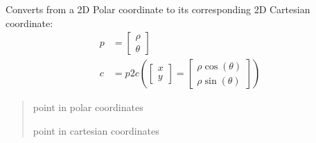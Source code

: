 \documentclass[letterpaper,10pt,english]{sphinxmanual}
\begin{document}
\begin{fulllineitems}
\label{\detokenize{conversions:conversions.p2c}}
\pysigstartsignatures
{}
\pysigstopsignatures
\sphinxAtStartPar
Converts from a 2D Polar coordinate to its corresponding 2D Cartesian coordinate:
\begin{equation}\label{equation:conversions:eq-p2c}
\begin{split}p & = \begin{bmatrix} \rho \\ \theta \end{bmatrix} \\
c &= p2c \left(\begin{bmatrix} x \\ y \end{bmatrix} =  \begin{bmatrix} \rho \cos(\theta) \\ \rho \sin(\theta) \end{bmatrix}\right)\end{split}
\end{equation}\begin{quote}\begin{description}
\sphinxAtStartPar
{} \textendash{} point in polar coordinates

\sphinxAtStartPar
point in cartesian coordinates

\end{description}\end{quote}

\end{fulllineitems}

\end{document}

